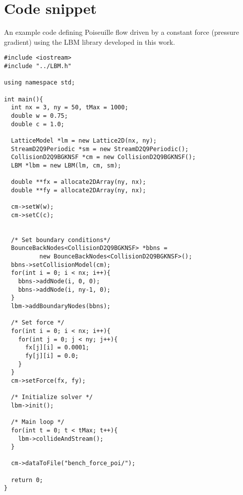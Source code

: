 \chapter{Code snippet}\label{app:poi_snippet}
An example code defining Poiseuille flow driven by a constant force
(pressure gradient) using the LBM library developed in this work.
\begin{verbatim}
#include <iostream>
#include "../LBM.h"

using namespace std;

int main(){
  int nx = 3, ny = 50, tMax = 1000;
  double w = 0.75;
  double c = 1.0;

  LatticeModel *lm = new Lattice2D(nx, ny);
  StreamD2Q9Periodic *sm = new StreamD2Q9Periodic();
  CollisionD2Q9BGKNSF *cm = new CollisionD2Q9BGKNSF();
  LBM *lbm = new LBM(lm, cm, sm);

  double **fx = allocate2DArray(ny, nx);
  double **fy = allocate2DArray(ny, nx);

  cm->setW(w);
  cm->setC(c);


  /* Set boundary conditions*/
  BounceBackNodes<CollisionD2Q9BGKNSF> *bbns =
          new BounceBackNodes<CollisionD2Q9BGKNSF>();
  bbns->setCollisionModel(cm);
  for(int i = 0; i < nx; i++){
    bbns->addNode(i, 0, 0);
    bbns->addNode(i, ny-1, 0);
  }
  lbm->addBoundaryNodes(bbns);

  /* Set force */
  for(int i = 0; i < nx; i++){
    for(int j = 0; j < ny; j++){
      fx[j][i] = 0.0001;
      fy[j][i] = 0.0;
    }
  }
  cm->setForce(fx, fy);

  /* Initialize solver */
  lbm->init();

  /* Main loop */
  for(int t = 0; t < tMax; t++){
    lbm->collideAndStream();
  }

  cm->dataToFile("bench_force_poi/");

  return 0;
}
\end{verbatim}
